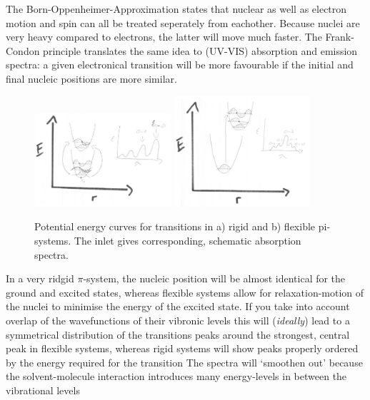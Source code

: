 \documentclass[10pt]{article}
\begin{document}
The Born-Oppenheimer-Approximation states that nuclear as well as electron motion and spin can all be treated seperately from eachother. Because nuclei are very heavy compared to electrons, the latter will move much faster. The Frank-Condon principle translates the same idea to (UV-VIS) absorption and emission spectra: a given electronical transition will be more favourable if the initial and final nucleic positions are more similar.\\
\begin{figure}[!h]
\includegraphics[width=0.45\textwidth]{f2a}
\includegraphics[width=0.45\textwidth]{f2b}
\caption{Potential energy curves for transitions in a) rigid and b) flexible pi-systems. The inlet gives corresponding, schematic absorption spectra.}
\end{figure}
In a very ridgid $\pi$-system, the nucleic position will be almost identical for the ground and excited states, whereas flexible systems allow for relaxation-motion of the nuclei to minimise the energy of the excited state. If you take into account overlap of the wavefunctions of their vibronic levels this will (\emph{ideally}) lead to a symmetrical distribution of the transitions peaks around the strongest, central peak in flexible systems, whereas rigid systems will show peaks properly ordered by the energy required for the transition
The spectra will `smoothen out' because the solvent-molecule interaction introduces many energy-levels in between the vibrational levels
\end{document}
